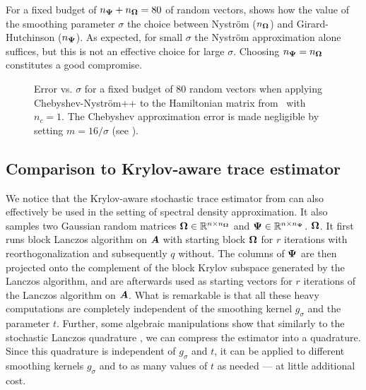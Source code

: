 For a fixed budget of $n_{\boldsymbol{\Psi}} + n_{\boldsymbol{\Omega}} = 80$ of random vectors,  shows how the value of the smoothing parameter $\sigma$ the choice between Nyström ($n_{\boldsymbol{\Omega}}$) and 
Girard-Hutchinson ($n_{\boldsymbol{\Psi}}$). As expected, for small $\sigma$ the Nyström approximation alone suffices, but 
this is not an effective choice for large $\sigma$. Choosing $n_{\boldsymbol{\Psi}} = n_{\boldsymbol{\Omega}}$ constitutes a good compromise.


\begin{figure}[ht]
    \centering
    
    \caption{Error vs. $\sigma$ for a fixed budget of $80$ random vectors 
    when applying  Chebyshev-Nyström++ to the Hamiltonian matrix from~ with $n_c = 1$.
The Chebyshev approximation error is made negligible by setting $m=16 / \sigma$ (see ).}
    \label{fig:distribution}
\end{figure}

\subsection{Comparison to Krylov-aware trace estimator}
\label{subsec:krylov-aware}

We notice that the Krylov-aware stochastic trace estimator from \cite[Algorithm 3.1]{chen-2023-krylovaware-stochastic} can also effectively be used in the setting of spectral density approximation. It also samples two Gaussian random matrices $\boldsymbol{\Omega} \in \mathbb{R}^{n \times n_{\boldsymbol{\Omega}}}$ and $\boldsymbol{\Psi} \in \mathbb{R}^{n \times n_{\boldsymbol{\Psi}}}$. $\boldsymbol{\Omega}$. It first runs block Lanczos algorithm on $\boldsymbol{A}$ with starting block $\boldsymbol{\Omega}$ for $r$ iterations with reorthogonalization and subsequently $q$ without. The columns of $\boldsymbol{\Psi}$ are then projected onto the complement of the block Krylov subspace generated by the Lanczos algorithm, and are afterwards used as starting vectors for $r$ iterations of the Lanczos algorithm on $\boldsymbol{A}$. What is remarkable is that all these heavy computations are completely independent of the smoothing kernel $g_{\sigma}$ and the parameter $t$. Further, some algebraic manipulations show that similarly to the stochastic Lanczos quadrature \cite[Section 3]{ubaru-2017-fast-estimation}, we can compress the estimator into a quadrature. Since this quadrature is independent of $g_{\sigma}$ and $t$, it can be applied to different smoothing kernels $g_{\sigma}$ and to as many values of $t$ as needed --- at little additional cost.

